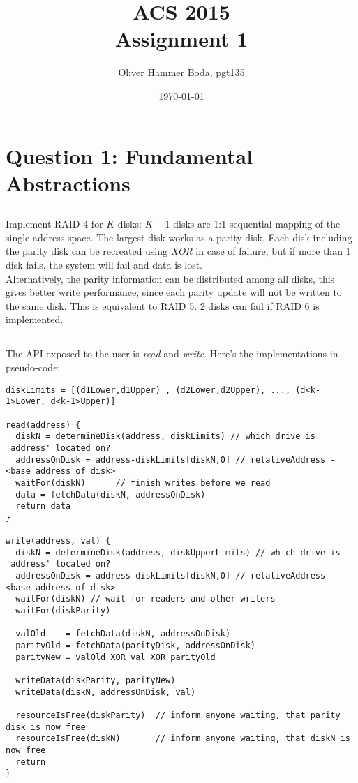 \documentclass[12pt]{article}
\begin{document}
\title{ACS 2015\\ Assignment 1}
\date{\today}
\author{Oliver Hammer Boda, pgt135\\}
\maketitle

\section{Question 1: Fundamental Abstractions}
\subsection{} %
Implement RAID 4 for $K$ disks: $K-1$ disks are 1:1 sequential mapping of the single address space. The largest disk works as a parity disk. Each disk including the parity disk can be recreated using \emph{XOR} in case of failure, but if more than 1 disk fails, the system will fail and data is lost.\\
Alternatively, the parity information can be distributed among all disks, this gives better write performance, since each parity update will not be written to the same disk. This is equivalent to RAID 5. 2 disks can fail if RAID 6 is implemented.

\subsection{} %
The API exposed to the user is \emph{read} and \emph{write}. Here's the implementations in pseudo-code:
\begin{lstlisting}
diskLimits = [(d1Lower,d1Upper) , (d2Lower,d2Upper), ..., (d<k-1>Lower, d<k-1>Upper)]

read(address) {
  diskN = determineDisk(address, diskLimits) // which drive is 'address' located on?
  addressOnDisk = address-diskLimits[diskN,0] // relativeAddress - <base address of disk>
  waitFor(diskN)      // finish writes before we read
  data = fetchData(diskN, addressOnDisk)
  return data
}

write(address, val) {
  diskN = determineDisk(address, diskUpperLimits) // which drive is 'address' located on?
  addressOnDisk = address-diskLimits[diskN,0] // relativeAddress - <base address of disk>
  waitFor(diskN) // wait for readers and other writers
  waitFor(diskParity)

  valOld    = fetchData(diskN, addressOnDisk)
  parityOld = fetchData(parityDisk, addressOnDisk)
  parityNew = valOld XOR val XOR parityOld

  writeData(diskParity, parityNew)
  writeData(diskN, addressOnDisk, val)

  resourceIsFree(diskParity)  // inform anyone waiting, that parity disk is now free
  resourceIsFree(diskN)       // inform anyone waiting, that diskN is now free
  return
}
\end{lstlisting}
\end{document}
